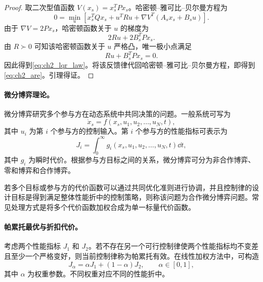 \begin{proof}
取二次型值函数 $V(x_s)=x_s^TPx_s$。哈密顿--雅可比--贝尔曼方程为
\begin{equation}
  0=\min_u\left[x_s^TQx_s+u^TRu+\nabla V^T(A_sx_s+B_su)\right].
\end{equation}
由于 $\nabla V=2Px_s$，哈密顿函数关于 $u$ 的梯度为
\begin{equation}
  2Ru+2B_s^TPx_s .
\end{equation}
由 $R\succ0$ 可知该哈密顿函数关于 $u$ 严格凸，唯一极小点满足
\begin{equation}
  Ru+B_s^TPx_s=0 .
\end{equation}
因此得到\eqref{eq:ch2_lqr_law}。将该反馈律代回哈密顿--雅可比--贝尔曼方程，即得到\eqref{eq:ch2_are}。引理得证。
\end{proof}

\paragraph{微分博弈理论。}
\label{subsec:ch2_differential_game}

微分博弈研究多个参与方在动态系统中共同决策的问题。一般系统可写为
\begin{equation}
  \dot x_s=f(x_s,u_1,u_2,\ldots,u_N,t),
  \label{eq:ch2_game_system}
\end{equation}
其中 $u_i$ 为第 $i$ 个参与方的控制输入。第 $i$ 个参与方的性能指标可表示为
\begin{equation}
  J_i=\int_0^\infty g_i(x_s,u_1,u_2,\ldots,u_N,t)\dd t,
  \label{eq:ch2_game_cost}
\end{equation}
其中 $g_i$ 为瞬时代价。根据参与方目标之间的关系，微分博弈可分为非合作博弈、零和博弈和合作博弈。

\begin{definition}[合作微分博弈]
\label{def:ch2_cooperative_game}
若多个目标或参与方的代价函数可以通过共同优化准则进行协调，并且控制律的设计目标是得到满足整体性能折中的控制策略，则称该问题为合作微分博弈问题。常见处理方式是将多个代价函数加权合成为单一标量代价函数。
\end{definition}

\paragraph{帕累托最优与折扣代价。}
\label{subsec:ch2_pareto_discount}

考虑两个性能指标 $J_1$ 和 $J_2$。若不存在另一个可行控制律使两个性能指标均不变差且至少一个严格变好，则当前控制律称为帕累托有效。在线性加权方法中，可构造
\begin{equation}
  J_\alpha=\alpha J_1+(1-\alpha)J_2,
  \qquad \alpha\in[0,1],
  \label{eq:ch2_pareto_scalarization}
\end{equation}
其中 $\alpha$ 为权重参数。不同权重对应不同的性能折中。

